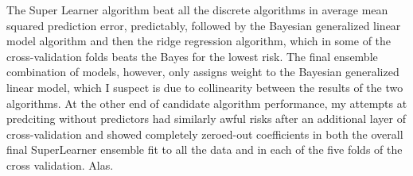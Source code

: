 \documentclass{article}\usepackage[]{graphicx}\usepackage[]{xcolor}
\begin{document}
The Super Learner algorithm beat all the discrete algorithms in average mean squared prediction error, predictably, followed by the Bayesian generalized linear model algorithm and then the ridge regression algorithm, which in some of the cross-validation folds beats the Bayes for the lowest risk. The final ensemble combination of models, however, only assigns weight to the Bayesian generalized linear model, which I suspect is due to collinearity between the results of the two algorithms. At the other end of candidate algorithm performance, my attempts at predciting without predictors had similarly awful risks after an additional layer of cross-validation and showed completely zeroed-out coefficients in both the overall final SuperLearner ensemble fit to all the data and in each of the five folds of the cross validation. Alas.
  
\end{document}
